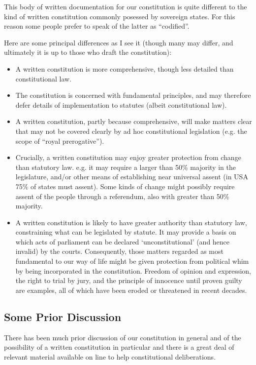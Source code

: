 \documentclass[14pt,titlepage]{extarticle}
\begin{document}
This body of written documentation for our constitution is quite different to the kind of written constitution commonly posessed by sovereign states.
For this reason some people prefer to speak of the latter as ``codified''.

Here are some principal differences as I see it (though many may differ, and ultimately it is up to those who draft the constitution):

\begin{itemize}
\item A written constitution is more comprehensive, though less detailed than constitutional law.
\item The constitution is concerned with fundamental principles, and may therefore defer details of implementation to statutes (albeit constitutional law).
\item A written constitution, partly because comprehensive, will make matters clear that may not be covered clearly by ad hoc constitutional legislation (e.g. the scope of ``royal prerogative'').
\item Crucially, a written constitution may enjoy greater protection from change than statutory law.
  e.g. it may require a larger than 50\% majority in the legislature, and/or other means of establishing near universal assent (in USA 75\% of states must assent).
  Some kinds of change might possibly require assent of the people through a referendum, also with greater than 50\% majority.
  
\item A written constitution is likely to have greater authority than statutory law, constraining what can be legislated by statute.
  It may provide a basis on which acts of parliament can be declared `unconstitutional' (and hence invalid) by the courts.
  Consequently, those matters regarded as most fundamental to our way of life might be given protection from political whim by being incorporated in the constitution.
  Freedom of opinion and expression, the right to trial by jury, and the principle of innocence until proven guilty are examples, all of which have been eroded or threatened in recent decades. 
\end{itemize}

\subsection{Some Prior Discussion}

There has been much prior discussion of our constitution in general and of the possibility of a written constitution in particular and there is a great deal of relevant material available on line to help constitutional deliberations.
\end{document}

